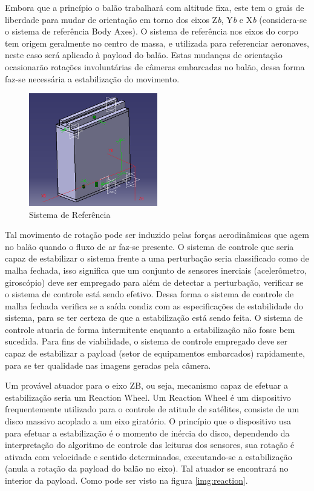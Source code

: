 Embora que a princípio o balão trabalhará com altitude fixa, este tem o grais de liberdade para mudar de orientação em torno dos eixos Z\textit{b}, Y\textit{b} e X\textit{b} (considera-se o sistema de referência Body Axes). O sistema de referência nos eixos do corpo tem origem geralmente no centro de massa, e utilizada para referenciar aeronaves, neste caso será aplicado à payload do balão. Estas mudanças de orientação ocasionarão rotações involuntárias de câmeras embarcadas no balão, dessa forma faz-se necessária a estabilização do movimento.~\cite{etkin2012dynamics}

	\begin{figure}[H]
		\centering
		\includegraphics[width=0.5\textwidth]{figuras/sistReferencia}
		\caption{Sistema de Referência}
		\label{img:sistReferencia}
	\end{figure}

Tal movimento de rotação pode ser induzido pelas forças aerodinâmicas que agem no balão quando o fluxo de ar faz-se presente. O sistema de controle que seria capaz de estabilizar o sistema frente a uma perturbação seria classificado como de malha fechada, isso significa que um conjunto de sensores inerciais (acelerômetro, giroscópio) deve ser empregado para além de detectar a perturbação, verificar se o sistema de controle está sendo efetivo. Dessa forma o sistema de controle de malha fechada verifica se a saída condiz com as especificações de estabilidade do sistema, para se ter certeza de que a estabilização está sendo feita. O sistema de controle atuaria de forma intermitente enquanto a estabilização não fosse bem sucedida. Para fins de viabilidade, o sistema de controle empregado deve ser capaz de estabilizar a payload (setor de equipamentos embarcados) rapidamente, para se ter qualidade nas imagens geradas pela câmera.

Um provável atuador para o eixo ZB, ou seja, mecanismo capaz de efetuar a estabilização seria um Reaction Wheel. Um Reaction Wheel é um dispositivo frequentemente utilizado para o controle de atitude de satélites, consiste de um disco massivo acoplado a um eixo giratório. O princípio que o dispositivo usa para efetuar a estabilização é o momento de inércia do disco, dependendo da interpretação do algoritmo de controle das leituras dos sensores, sua rotação é ativada com velocidade e sentido determinados, executando-se a estabilização (anula a rotação da payload do balão no eixo). Tal atuador se encontrará no interior da payload. Como pode ser visto na figura \ref{img:reaction}.

